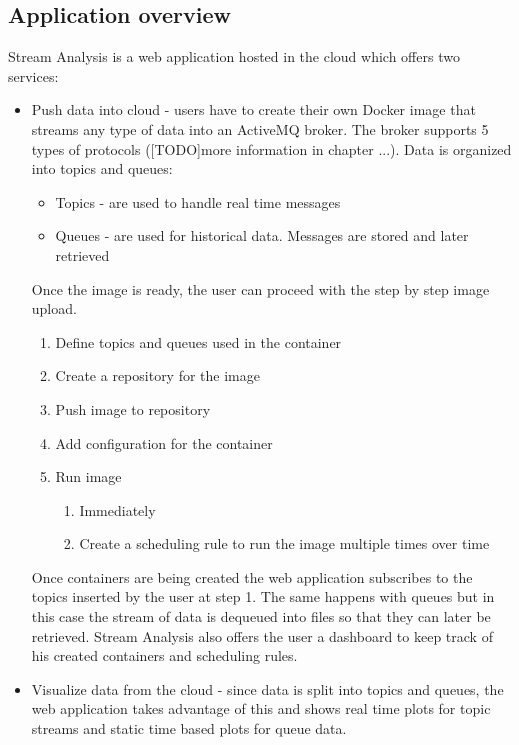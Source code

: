 \subsection{Application overview}
\label{chap:02:02:01}
Stream Analysis is a web application hosted in the cloud which offers two services:
\begin{itemize}
	\item Push data into cloud - users have to create their own Docker image that streams any type of data into an ActiveMQ broker. The broker supports 5 types of protocols ([TODO]more information in chapter ...). Data is organized into topics and queues:
	\begin{itemize}
		\item Topics - are used to handle real time messages
		\item Queues - are used for historical data. Messages are stored and later retrieved
	\end{itemize}
	Once the image is ready, the user can proceed with the step by step image upload. 
	\begin{enumerate}
		\item Define topics and queues used in the container
		\item Create a repository for the image
		\item Push image to repository
		\item Add configuration for the container
		\item Run image
		\begin{enumerate}
			\item Immediately
			\item Create a scheduling rule to run the image multiple times over time
		\end{enumerate}
	\end{enumerate}
	Once containers are being created the web application subscribes to the topics inserted by the user at step 1. The same happens with queues but in this case the stream of data is dequeued into files so that they can later be retrieved. 
	Stream Analysis also offers the user a dashboard to keep track of his created containers and scheduling rules.
	\item Visualize data from the cloud - since data is split into topics and queues, the web application takes advantage of this and shows real time plots for topic streams and static time based plots for queue data.
\end{itemize}

